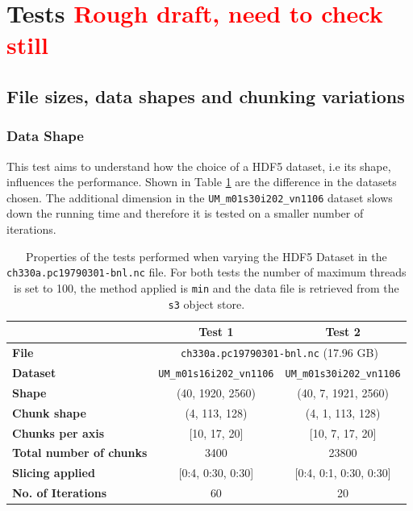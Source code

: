 \documentclass{article}
\begin{document}
\section{Tests \textcolor{red}{Rough draft, need to check still}}


\subsection{File sizes, data shapes and chunking variations}
\subsubsection{Data Shape}
This test aims to understand how the choice of a HDF5 dataset, i.e its shape, influences the performance. Shown in Table \ref{tab:T1T2_Conditions} are the difference in the datasets chosen. The additional dimension in the \texttt{UM\_m01s30i202\_vn1106} dataset slows down the running time and therefore it is tested on a smaller number of iterations. 
\begin{table}[h!] 
    \centering 
    \begin{tabular}{lcc}  \hline
                                        & Test 1                            & Test 2                              \\ \hline
        \textbf{File}                   & \multicolumn{2}{c}{ \texttt{ch330a.pc19790301-bnl.nc}  (17.96  GB)}     \\                                       
        \textbf{Dataset}                &\texttt{UM\_m01s16i202\_vn1106}    & \texttt{UM\_m01s30i202\_vn1106}     \\ 
        \textbf{Shape}                  & (40, 1920, 2560)                  & (40, 7, 1921, 2560)                 \\ 
        \textbf{Chunk shape}            & (4, 113, 128)                     & (4, 1, 113, 128)                    \\ 
        \textbf{Chunks per axis}        & [10, 17, 20]                      & [10, 7, 17, 20]                     \\ 
        \textbf{Total number of chunks} & 3400                              &   23800                             \\ 
        \textbf{Slicing applied}        & [0:4, 0:30, 0:30]                 &[0:4, 0:1, 0:30, 0:30]               \\ 
        \textbf{No. of Iterations}      & 60                                & 20                                  \\  \hline
    \end{tabular} 
    \caption{Properties of the tests performed when varying the HDF5 Dataset in the \texttt{ch330a.pc19790301-bnl.nc} file. For both tests the number of maximum threads is set to 100, the method applied is \texttt{min} and the data file is retrieved from the \texttt{s3} object store.} 
    \label{tab:T1T2_Conditions} 
\end{table}
\end{document}
